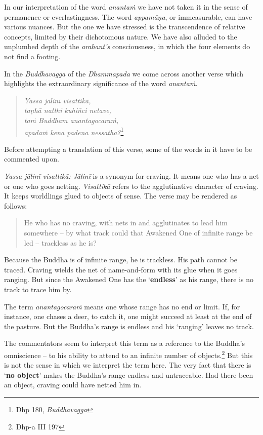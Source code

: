 In our interpretation of the word \emph{anantaṁ} we have not taken it in the sense of permanence or everlastingness. The word \emph{appamāṇa}, or immeasurable, can have various nuances. But the one we have stressed is the transcendence of relative concepts, limited by their dichotomous nature. We have also alluded to the unplumbed depth of the \emph{arahant's} consciousness, in which the four elements do not find a footing.

In the \emph{Buddhavagga} of the \emph{Dhammapada} we come across another verse which highlights the extraordinary significance of the word \emph{anantaṁ}.

\begin{quote}
\emph{Yassa jālinī visattikā,}\\
\emph{taṇhā natthi kuhiñci netave,}\\
\emph{taṁ Buddham anantagocaraṁ,}\\
\emph{apadaṁ kena padena nessatha?}\footnote{Dhp 180, \emph{Buddhavagga}}
\end{quote}

Before attempting a translation of this verse, some of the words in it have to be commented upon.

\emph{Yassa jālinī visattikā:} \emph{Jālinī} is a synonym for craving. It means one who has a net or one who goes netting. \emph{Visattikā} refers to the agglutinative character of craving. It keeps worldlings glued to objects of sense. The verse may be rendered as follows:

\begin{quote}
He who has no craving, with nets in and agglutinates to lead him somewhere -- by what track could that Awakened One of infinite range be led -- trackless as he is?
\end{quote}

Because the Buddha is of infinite range, he is trackless. His path cannot be traced. Craving wields the net of name-and-form with its glue when it goes ranging. But since the Awakened One has the `\textbf{endless}' as his range, there is no track to trace him by.

The term \emph{anantagocaraṁ} means one whose range has no end or limit. If, for instance, one chases a deer, to catch it, one might succeed at least at the end of the pasture. But the Buddha's range is endless and his `ranging' leaves no track.

The commentators seem to interpret this term as a reference to the Buddha's omniscience -- to his ability to attend to an infinite number of objects.\footnote{Dhp-a III 197} But this is not the sense in which we interpret the term here. The very fact that there is `\textbf{no object}' makes the Buddha's range endless and untraceable. Had there been an object, craving could have netted him in.

